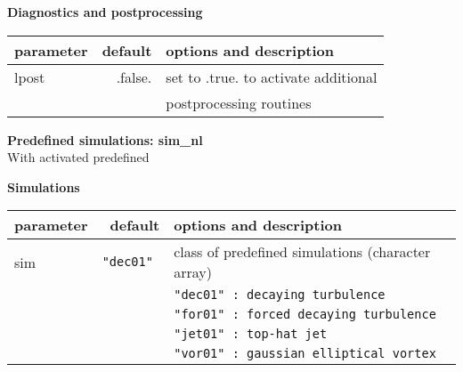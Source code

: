 \vspace{0.5cm}

\noindent
{\bf Diagnostics and postprocessing} \\
\noindent
\begin{tabular}{|l|r|l|}
 \hline
 parameter & default & options and description \\
 \hline
 lpost        &  .false. & set to .true. to activate additional  \\
              &          & postprocessing routines               \\
 \hline
\end{tabular}

\vspace{0.5cm}
\noindent
{\bf \Large Predefined simulations: sim{\_}nl} \\
With activated predefined     

{\bf Simulations} \\
\noindent
\begin{tabular}{|l|r|l|}
 \hline
 parameter & default & options and description \\
 \hline
 sim          &  \tt{"dec01"} & class of predefined simulations (character array) \\
              &                & \tt{"dec01"} : decaying turbulence \\
              &                & \tt{"for01"} : forced decaying turbulence \\
              &                & \tt{"jet01"} : top-hat jet \\
              &                & \tt{"vor01"} : gaussian elliptical vortex \\
 \hline
\end{tabular}
